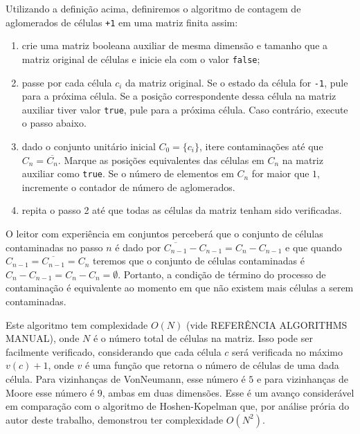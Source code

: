 \documentclass[
	12pt,				%
	openright,			%
	twoside,			%
	a4paper,			%
	english,			%
	french,				%
	spanish,			%
	brazil				%
	]{abntex2}
\begin{document}
 Utilizando a definição acima, definiremos o algoritmo de contagem de aglomerados de células \texttt{+1} em uma matriz finita assim: 
\begin{enumerate}
	\item crie uma matriz booleana auxiliar de mesma dimensão e tamanho que a matriz original de células e inicie ela com o valor \texttt{false};
	\item passe por cada célula $c_i$ da matriz original. Se o estado da célula for \texttt{-1}, pule para a próxima célula. Se a posição correspondente dessa célula na matriz auxiliar tiver valor \texttt{true}, pule para a próxima célula. Caso contrário, execute o passo abaixo.
	\item dado o conjunto unitário inicial $C_0=\{c_i\}$, itere contaminações até que $C_n=\overline{C_n}$. Marque as posições equivalentes das células em $C_n$ na matriz auxiliar como \texttt{true}. Se o número de elementos em $C_n$ for maior que $1$, incremente o contador de número de aglomerados.
	\item repita o passo 2 até que todas as células da matriz tenham sido verificadas.
\end{enumerate}

O leitor com experiência em conjuntos perceberá que o conjunto de células contaminadas no passo $n$ é dado por $\overline{C_{n-1}}-C_{n-1}=C_n-C_{n-1}$ e que quando $C_{n-1}=\overline{C_{n-1}}=C_n$ teremos que o conjunto de células contaminadas é $C_n-C_{n-1}=C_n-C_n=\emptyset$. Portanto, a condição de término do processo de contaminação é equivalente ao momento em que não existem mais células a serem contaminadas.

Este algoritmo tem complexidade $O(N)$ (vide REFERÊNCIA ALGORITHMS MANUAL), onde $N$ é o número total de células na matriz. Isso pode ser facilmente verificado, considerando que cada célula $c$ será verificada no máximo $v(c)+1$, onde $v$ é uma função que retorna o número de células de uma dada célula. Para vizinhanças de VonNeumann, esse número é $5$ e para vizinhanças de Moore esse número é $9$, ambas em duas dimensões. Esse é um avanço considerável em comparação com o algoritmo de  Hoshen-Kopelman que, por análise prória do autor deste trabalho, demonstrou ter complexidade $O(N^2)$.
\end{document}

